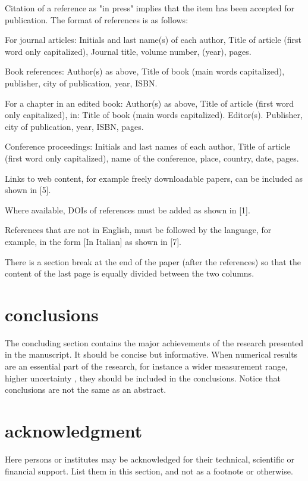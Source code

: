 \documentclass[10pt]{../imeko_acta}
\begin{document}
Citation of a reference as "in press" implies that the item has been accepted for publication.
The format of references is as follows:

\begin{enumerate-a}
	\item For journal articles: Initials and last name(s) of each author, Title of article (first word only capitalized), Journal title, volume number, (year), pages.
	\item Book references: Author(s) as above, Title of book (main words capitalized), publisher, city of publication, year, ISBN. 
	\item For a chapter in an edited book: Author(s) as above, Title of article (first word only capitalized), in: Title of book (main words capitalized). Editor(s). Publisher, city of publication, year, ISBN, pages.
	\item Conference proceedings: Initials and last names of each author, Title of article (first word only capitalized), name of the conference, place, country, date, pages.
	\item Links to web content, for example freely downloadable papers, can be included as shown in [5].
	\item Where available, DOIs of references must be added as shown in [1].
	\item References that are not in English, must be followed by the language, for example, in the form [In Italian] as shown in [7].
\end{enumerate-a}

There is a section break at the end of the paper (after the references) so that the content of the last page is equally divided between the two columns.


\section{conclusions}
The concluding section contains the major achievements of the research presented in the manuscript. It should be concise but informative\cite{cruz2008}. When numerical results are an essential part of the research, for instance a wider measurement range, higher uncertainty \cite{Pop2006}, they should be included in the conclusions.
Notice that conclusions are not the same as an abstract.


\section*{acknowledgment} 

Here persons or institutes may be acknowledged for their technical, scientific or financial support. List them in this section, and not as a footnote or otherwise.



\end{document}
